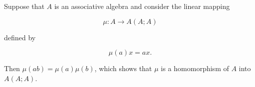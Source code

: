 Suppose that $A$ is an associative algebra and consider the linear mapping

$$\mu: A \rightarrow A(A; A)$$

defined by

$$\mu(a)x = ax.$$

Then $\mu(a b) = \mu(a) \mu(b)$, which shows that $\mu$ is a homomorphism of $A$ into $A(A; A)$.
